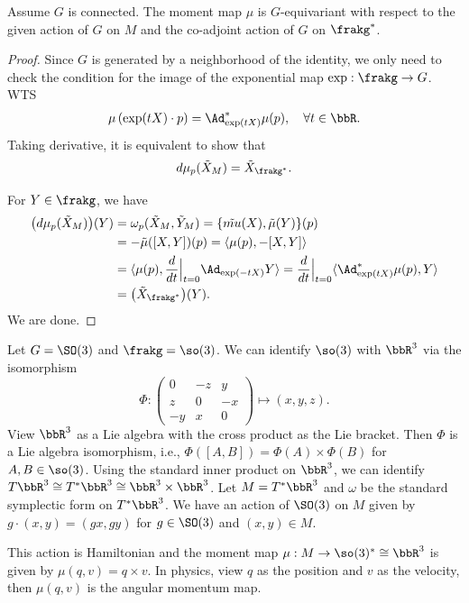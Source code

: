   \begin{lemma}
    Assume $G$ is connected.
    The moment map $\mu$ is $G$-equivariant with respect to the given action of $G$ on $M$ and the co-adjoint action of $G$ on $\frakg^*$.
  \end{lemma}
  \begin{proof} 
    Since $G$ is generated by a neighborhood of the identity, we only need to check the condition for the image of the exponential map $\exp: \frakg \to G$.
    WTS
    \begin{equation}
      \mu\left( \exp(tX) \cdot p \right) = \Ad^*_{\exp(tX)} \mu(p), \quad \forall t \in \bbR.
    \end{equation} 
    Taking derivative, it is equivalent to show that
    \[ d \mu_p(\tilde{X}_M) = \tilde{X}_{\frakg^*}. \]

    For $Y \in \frakg$, we have
    \begin{align*}
      \bigl(d \mu_p(\tilde{X}_M)\bigr)(Y) & = \omega_p(\tilde{X}_M, \tilde{Y}_M) = \{ \tilde{mu}(X), \tilde{\mu}(Y) \} (p) \\
        & = - \tilde{\mu}([X,Y])(p) = \langle \mu(p), -[X,Y] \rangle \\
        & = \langle \mu(p), \frac{d}{dt}\Big|_{t=0} \Ad_{\exp(-tX)} Y \rangle  = \frac{d}{dt}\Big|_{t=0} \langle \Ad^*_{\exp(tX)} \mu(p), Y \rangle \\
        & = \bigl( \tilde{X}_{\frakg^*} \bigr)(Y).
    \end{align*}
    We are done.
  \end{proof}

  \begin{example}
    Let $G = \SO(3)$ and $\frakg = \so(3)$.
    We can identify $\so(3)$ with $\bbR^3$ via the isomorphism
    \[ \Phi: \begin{pmatrix}
        0 & -z & y \\
        z & 0 & -x \\
        -y & x & 0
      \end{pmatrix} \mapsto (x,y,z). \]
    View $\bbR^3$ as a Lie algebra with the cross product as the Lie bracket.
    Then $\Phi$ is a Lie algebra isomorphism, i.e., $\Phi([A,B]) = \Phi(A) \times \Phi(B)$ for $A,B \in \so(3)$.
    Using the standard inner product on $\bbR^3$, we can identify $T\bbR^3 \cong T^* \bbR^3 \cong \bbR^3 \times \bbR^3$.
    Let $M = T^* \bbR^3$ and $\omega$ be the standard symplectic form on $T^* \bbR^3$.
    We have an action of $\SO(3)$ on $M$ given by $g \cdot (x,y) = (gx, gy)$ for $g \in \SO(3)$ and $(x,y) \in M$.

    This action is Hamiltonian and the moment map $\mu: M \to \so(3)^* \cong \bbR^3$ is given by $\mu(q,v) = q \times v$.
    In physics, view $q$ as the position and $v$ as the velocity, then $\mu(q,v)$ is the angular momentum map.
  \end{example}

